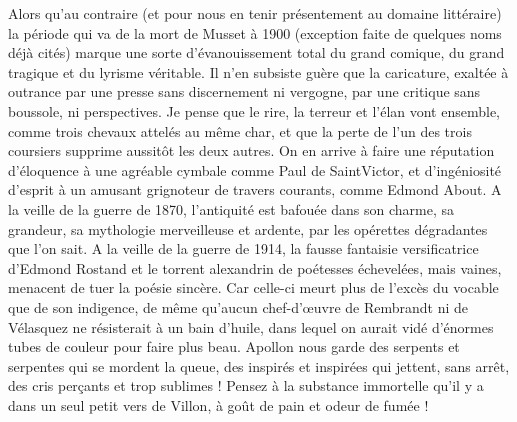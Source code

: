 \documentclass[french,twoside]{book} %
\begin{document}
Alors qu’au contraire (et pour nous en tenir présentement au domaine littéraire) la période qui va de la mort de Musset à 1900 (exception faite de quelques noms déjà cités) marque une sorte d’évanouissement total du grand comique, du grand tragique et du lyrisme véritable. Il n’en subsiste guère que la caricature, exaltée à outrance par une presse sans discernement ni vergogne, par une critique sans boussole, ni perspectives. Je pense que le rire, la terreur et l’élan vont ensemble, comme trois chevaux attelés au même char, et que la perte de l’un des trois coursiers supprime aussitôt les deux autres. On en arrive à faire une réputation d’éloquence à une agréable cymbale comme Paul de SaintVictor, et d’ingéniosité d’esprit à un amusant grignoteur de travers courants, comme Edmond About. A la veille de la guerre de 1870, l’antiquité est bafouée dans son charme, sa grandeur, sa mythologie merveilleuse et ardente, par les opérettes dégradantes que l’on sait. A la veille de la guerre de 1914, la fausse fantaisie versificatrice d’Edmond Rostand et le torrent alexandrin de poétesses échevelées, mais vaines, menacent de tuer la poésie sincère. Car celle-ci meurt plus de l’excès du vocable que de son indigence, de même qu’aucun chef-d’œuvre de Rembrandt ni de Vélasquez ne résisterait à un bain d’huile, dans lequel on aurait vidé d’énormes tubes de couleur pour faire plus beau. Apollon nous garde des serpents et serpentes qui se mordent la queue, des inspirés et inspirées qui jettent, sans arrêt, des cris perçants et trop sublimes ! Pensez à la substance immortelle qu’il y a dans un seul petit vers de Villon, à goût de pain et odeur de fumée !\par
\end{document}
